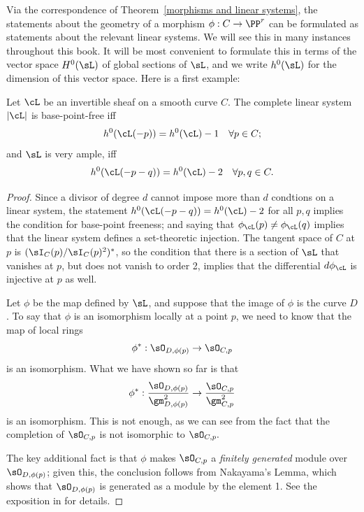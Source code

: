 Via the correspondence of Theorem~\ref{morphisms and linear systems}, the statements about the geometry of a morphism $\phi : C \to \PP^r$ can be formulated as statements about the relevant linear systems. We will see this in many instances throughout this book. It will be most convenient to formulate this in terms of the vector space $H^{0}(\sL)$ of global sections of $\sL$, and we write $h^{0}(\sL)$ for the dimension of this vector space. Here is a first example:

\begin{proposition}\label{very ample}\cite[Thm. IV.3.1]{H}
Let $\cL$ be an invertible sheaf on a smooth curve $C$. The complete linear system $|\cL|$ is base-point-free iff
$$
h^0(\cL(-p)) = h^0(\cL) - 1 \quad \forall p \in C;
$$
and $\sL$ is very ample, iff
$$
h^0(\cL(-p-q)) = h^0(\cL) - 2 \quad \forall p, q \in C.
$$
\end{proposition} 

\begin{proof}
Since a divisor of degree $d$ cannot impose more than $d$ condtions on a linear system, the statement $h^0(\cL(-p-q)) = h^0(\cL) - 2$ for all $p, q$ implies the condition for base-point freeness; and saying that $\phi_\cL(p) \neq \phi_\cL(q)$ implies that the linear system defines a set-theoretic injection. The tangent space of $C$ at $p$ is $(\sI_C(p)/\sI_C(p)^2)^*$, so the condition that there is a section of $\sL$ that vanishes at $p$, but does not vanish
to order 2, implies that the differential $d\phi_\cL$ is injective at $p$ as well.

Let $\phi$ be the map defined by $\sL$, and suppose that the image of $\phi$ is the curve $D$. To say that $\phi$  is an isomorphism locally at a point $p$, we need to know that the map of local rings
$$
\phi^*: \sO_{D,\phi(p)} \to \sO_{C,p}
$$
is an isomorphism. What we have shown so far is that 
$$
\phi^*: \frac{\sO_{D,\phi(p)}}{\gm_{D,\phi(p)}^2} \to \frac{\sO_{C,p}}{\gm_{C,p}^2}
$$
is an isomorphism. This is not enough, as we can see from the fact that the completion of $\sO_{C,p}$ is not
isomorphic to $\sO_{C,p}.$

The key additional fact is that $\phi$ makes $\sO_{C,p}$  a \emph{finitely generated} module over 
$\sO_{D,\phi(p)}$;
given this, the conclusion follows from Nakayama's Lemma, which shows that
$\sO_{D,\phi(p)}$ is generated as a module by the element 1.
See the exposition in \cite[Proposition 7.3 and Lemma 7.4]{H} for details.
\end{proof}


